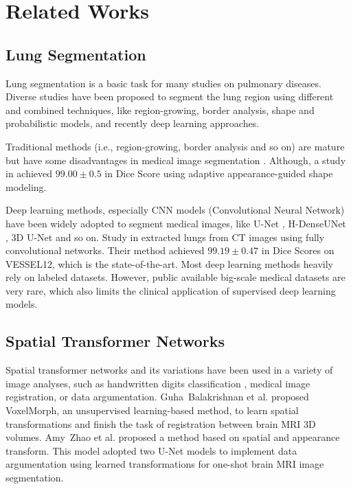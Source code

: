 \documentclass{article}
\begin{document}
\section{Related Works}
\label{sec:related}
\subsection{Lung Segmentation}
Lung segmentation is a basic task for many studies on pulmonary diseases. Diverse studies have been proposed to segment the lung region using different and combined techniques, like region-growing, border analysis, shape and probabilistic models, and recently deep learning approaches.

Traditional methods (i.e., region-growing, border analysis and so on) are mature but have some disadvantages in medical image segmentation \cite{adams1994seeded, kass1988snakes, canny1987computational}.
Although, a study in \cite{soliman2016accurate} achieved $99.00 \pm 0.5$ in Dice Score using adaptive appearance-guided shape modeling.

Deep learning methods, especially CNN models (Convolutional Neural Network) have been widely adopted to segment medical images, like U-Net \cite{ronneberger2015u}, H-DenseUNet \cite{li2018h}, 3D U-Net \cite{cciccek20163d} and so on. 
Study in \cite{alves2018extracting} extracted lungs from CT images using fully convolutional networks. Their method achieved $99.19 \pm 0.47$ in Dice Scores on VESSEL12, which is the state-of-the-art.
Most deep learning methods heavily rely on labeled datasets. However, public available big-scale medical datasets are very rare, which also limits the clinical application of supervised deep learning models.

\subsection{Spatial Transformer Networks}
Spatial transformer networks \cite{jaderberg2015spatial} and its variations have been used in a variety of image analyses, such as handwritten digits classification \cite{hauberg2016dreaming, learned2005data}, medical image registration, or data argumentation.
Guha~Balakrishnan et al. \cite{balakrishnan2019tmi} proposed VoxelMorph, an unsupervised learning-based method, to learn spatial transformations and finish the task of registration between brain MRI 3D volumes. Amy~Zhao et al. \cite{zhao2019data} proposed a method based on spatial and appearance transform. This model adopted two U-Net models to implement data argumentation using learned transformations for one-shot brain MRI image segmentation. 
\end{document}
